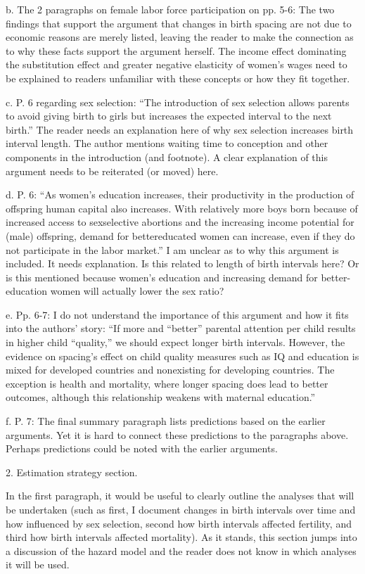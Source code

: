 \documentclass[letterpaper,12pt]{article}
\begin{document}
b. The 2 paragraphs on female labor force participation on pp. 5-6: The two findings that
support the argument that changes in birth spacing are not due to economic reasons are
merely listed, leaving the reader to make the connection as to why these facts support the
argument herself. The income effect dominating the substitution effect and greater negative
elasticity of women’s wages need to be explained to readers unfamiliar with these concepts
or how they fit together.

c. P. 6 regarding sex selection: “The introduction of sex selection allows parents to avoid
giving birth to girls but increases the expected interval to the next birth.” The reader
needs an explanation here of why sex selection increases birth interval length. The author
mentions waiting time to conception and other components in the introduction (and
footnote). A clear explanation of this argument needs to be reiterated (or moved) here.

d. P. 6: “As women’s education increases, their productivity in the production of offspring
human capital also increases. With relatively more boys born because of increased access to
sexselective abortions and the increasing income potential for (male) offspring, demand for
bettereducated women can increase, even if they do not participate in the labor market.” I
am unclear as to why this argument is included. It needs explanation. Is this related to
length of birth intervals here? Or is this mentioned because women’s education and
increasing demand for better-education women will actually lower the sex ratio?

e. Pp. 6-7: I do not understand the importance of this argument and how it fits into the
authors’ story: “If more and “better” parental attention per child results in higher child
“quality,” we should expect longer birth intervals. However, the evidence on spacing’s
effect on child quality measures such as IQ and education is mixed for developed countries
and nonexisting for developing countries. The exception is health and mortality, where
longer spacing does lead to better outcomes, although this relationship weakens with
maternal education.”

f. P. 7: The final summary paragraph lists predictions based on the earlier arguments. Yet
it is hard to connect these predictions to the paragraphs above. Perhaps predictions could
be noted with the earlier arguments.

2. Estimation strategy section.

In the first paragraph, it would be useful to clearly outline the analyses that will be
undertaken (such as first, I document changes in birth intervals over time and how
influenced by sex selection, second how birth intervals affected fertility, and third how
birth intervals affected mortality). As it stands, this section jumps into a discussion of
the hazard model and the reader does not know in which analyses it will be used.
\end{document}
